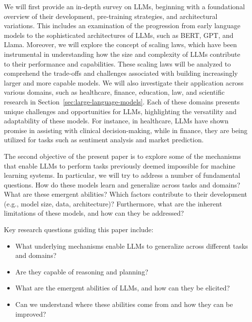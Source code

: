 We will first provide an in-depth survey on LLMs, beginning with a foundational overview of their development, pre-training strategies, and architectural variations.
This includes an examination of the progression from early language models to the sophisticated architectures of LLMs, such as BERT, GPT, and Llama.
Moreover, we will explore the concept of scaling laws, which have been instrumental in understanding how the size and complexity of LLMs contribute to their performance and capabilities. %
These scaling laws will be analyzed to comprehend the trade-offs and challenges associated with building increasingly larger and more capable models.
We will also investigate their application across various domains, such as healthcare, finance, education, law, and scientific research in Section~\ref{sec:large-language-models}.
Each of these domains presents unique challenges and opportunities for LLMs, highlighting the versatility and adaptability of these models.
For instance, in healthcare, LLMs have shown promise in assisting with clinical decision-making, while in finance, they are being utilized for tasks such as sentiment analysis and market prediction.

The second objective of the present paper is to explore some of the mechanisms that enable LLMs to perform tasks previously deemed impossible for machine learning systems.
In particular, we will try to address a number of fundamental questions.
How do these models learn and generalize across tasks and domains?
What are these emergent abilities?
Which factors contribute to their development (e.g., model size, data, architecture)?
Furthermore, what are the inherent limitations of these models, and how can they be addressed?

\noindent Key research questions guiding this paper include:

\begin{itemize}
	\item What underlying mechanisms enable LLMs to generalize across different tasks and domains?
	\item Are they capable of reasoning and planning?
	\item What are the emergent abilities of LLMs, and how can they be elicited?
	\item Can we understand where these abilities come from and how they can be improved?
\end{itemize}






